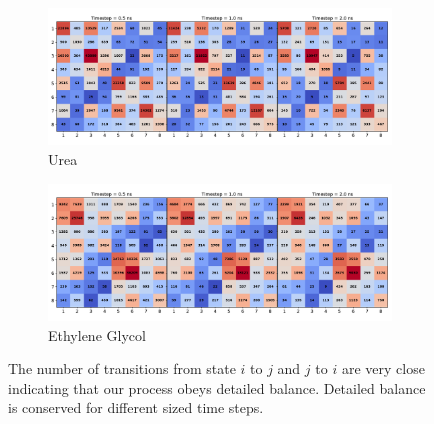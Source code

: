 \documentclass{article}
\begin{document}
  \begin{figure}
  \centering
  \begin{subfigure}{\textwidth}
  \includegraphics[width=\textwidth]{URE_counts.pdf}
  \caption{Urea}\label{fig:URE_counts}
  \end{subfigure}
  \begin{subfigure}{\textwidth}
  \includegraphics[width=\textwidth]{GCL_counts.pdf}
  \caption{Ethylene Glycol}\label{fig:GCL_counts}
  \end{subfigure}
  \caption{The number of transitions from state $i$ to $j$ and $j$ to $i$ are very close
  indicating that our process obeys detailed balance. Detailed balance is conserved for 
  different sized time steps.}\label{fig:counts}
  \end{figure}
  
\end{document}
